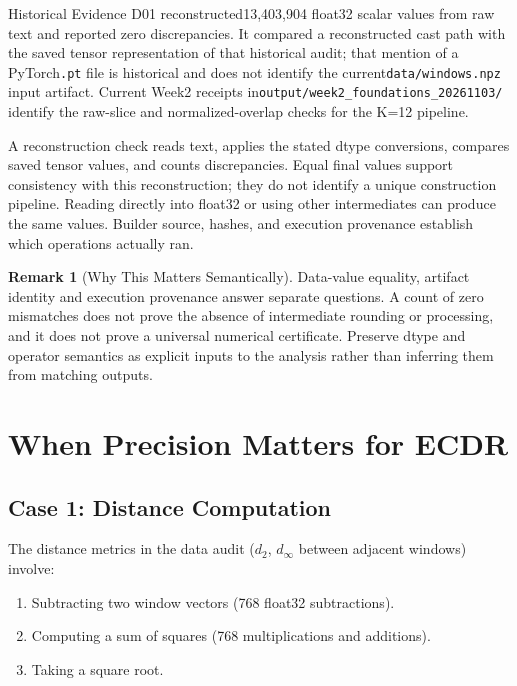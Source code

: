 \documentclass[11pt, a4paper]{article}
\theoremstyle{definition}
\newtheorem{remark}{Remark}[section]
\theoremstyle{plain}
\newcommand{\code}[1]{{\small\ttfamily\nolinkurl{#1}}}
\begin{document}
Historical Evidence D01 reconstructed13,403,904 float32 scalar values
from raw text and reported zero discrepancies. It compared a reconstructed
cast path with the saved tensor representation of that historical audit;
that mention of a PyTorch\code{.pt} file is historical and does not identify
the current\code{data/windows.npz} input artifact. Current Week2 receipts
in\code{output/week2_foundations_20261103/} identify the raw-slice and
normalized-overlap checks for the K=12 pipeline.

A reconstruction check reads text, applies the stated dtype conversions,
compares saved tensor values, and counts discrepancies. Equal final values
support consistency with this reconstruction; they do not identify a unique
construction pipeline. Reading directly into float32 or using other
intermediates can produce the same values. Builder source, hashes, and
execution provenance establish which operations actually ran.

\begin{remark}[Why This Matters Semantically]
Data-value equality, artifact identity and execution provenance answer
separate questions. A count of zero mismatches does not prove the absence
of intermediate rounding or processing, and it does not prove a universal
numerical certificate. Preserve dtype and operator semantics as explicit
inputs to the analysis rather than inferring them from matching outputs.
\end{remark}

\section{When Precision Matters for ECDR}

\subsection{Case 1: Distance Computation}

The distance metrics in the data audit ($d_2$, $d_\infty$ between adjacent windows)
involve:
\begin{enumerate}[leftmargin=1.5em]
  \item Subtracting two window vectors (768 float32 subtractions).
  \item Computing a sum of squares (768 multiplications and additions).
  \item Taking a square root.
\end{enumerate}
\end{document}
